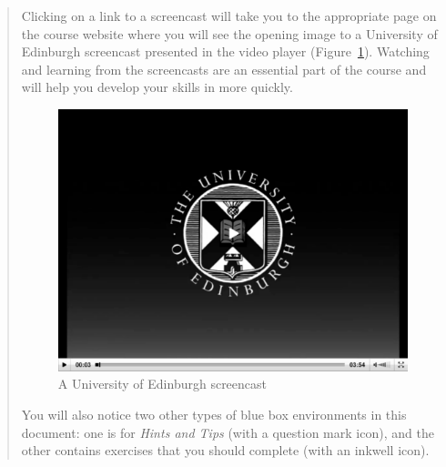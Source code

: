 \begin{quote}
Clicking on a link to a screencast will take you to the appropriate page on the course website where you will see the opening image to a University of Edinburgh screencast presented in the video player (Figure~\ref{fig:screencast}). Watching and learning from the screencasts are an essential part of the course and will help you develop your skills in \mlab more quickly.
\begin{figure}
	\myfloatalign
	\includegraphics[width=\linewidth]{Graphics/General/screencast}
	\caption{A University of Edinburgh screencast}
	\label{fig:screencast}
\end{figure}

You will also notice two other types of blue box environments in this document: one is for \textit{Hints and Tips} (with a question mark icon), and the other contains exercises that you should complete (with an inkwell icon).
\end{quote}
\addtolength{\parindent}{-4mm}
